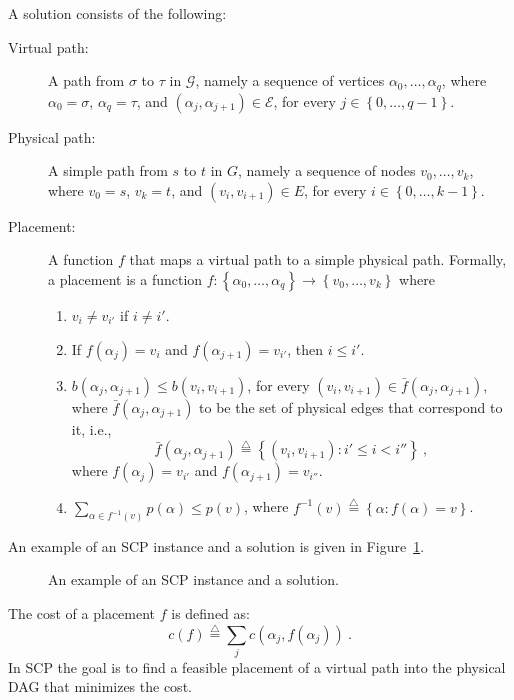 \documentclass[11pt]{article}
\newcommand{\eqdf}{\stackrel{\scriptscriptstyle \triangle}{=}}
\newcommand{\set}[1]{\left\{ #1 \right\}}
\newcommand{\scp}{\textsc{SCP}\xspace}
\newcommand{\calE}{\mathcal{E}}
\newcommand{\calG}{\mathcal{G}}
\begin{document}
A solution consists of the following:
\begin{description}
\item[Virtual path:] A path from $\sigma$ to $\tau$ in $\calG$, namely
  a sequence of vertices $\alpha_0,\ldots,\alpha_q$, where
  $\alpha_0 = \sigma$, $\alpha_q = \tau$, and
  $(\alpha_j,\alpha_{j+1}) \in \calE$, for every $j \in
  \set{0,\ldots,q-1}$.

\medskip
  
\item[Physical path:] A simple path from $s$ to $t$ in $G$, namely a
  sequence of nodes $v_0,\ldots,v_k$, where $v_0 = s$, $v_k = t$, and
  $(v_i,v_{i+1}) \in E$, for every $i \in \set{0,\ldots,k-1}$.

\medskip
  
\item[Placement:] A function $f$ that maps a virtual path to a simple
  physical path.  Formally, a placement is a function $f:
  \set{\alpha_0,\ldots,\alpha_q} \to \set{v_0,\ldots,v_k}$ where 
\begin{enumerate}
\item $v_i \neq v_{i'}$ if $i \neq i'$.    
\item If $f(\alpha_j) = v_i$ and $f(\alpha_{j+1}) = v_{i'}$, then $i
  \leq i'$.
\item $b(\alpha_j,\alpha_{j+1}) \leq b(v_i,v_{i+1})$, for every
  $(v_i,v_{i+1}) \in \bar{f}(\alpha_j,\alpha_{j+1})$, where
  $\bar{f}(\alpha_j,\alpha_{j+1})$ to be the set of physical edges
  that correspond to it, i.e.,
\[
\bar{f}(\alpha_j,\alpha_{j+1}) \eqdf \set{(v_i,v_{i+1}) : i' \leq i < i''}
~,
\]
  where $f(\alpha_j) = v_{i'}$ and $f(\alpha_{j+1}) = v_{i''}$.

\item $\sum_{\alpha \in f^{-1}(v)} p(\alpha) \leq p(v)$, where
  $f^{-1}(v) \eqdf \set{\alpha : f(\alpha) = v}$.
 
\end{enumerate}
\end{description}

An example of an \scp instance and a solution is given in
Figure~\ref{fig:solution}.

\begin{figure}[t]
\centering
\scalebox{0.9}{

}
\caption{An example of an \scp instance and a solution.}
\label{fig:solution}
\end{figure}

The cost of a placement $f$ is defined as:
\[
c(f) \eqdf \sum_j c(\alpha_j,f(\alpha_j))
~.
\]
In \scp the goal is to find a feasible placement of a virtual path
into the physical DAG that minimizes the cost.
\end{document}
